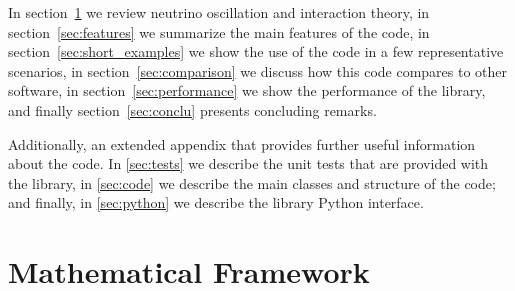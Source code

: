 \documentclass[3p,12pt]{elsarticle}
\newcommand{\ttf}{\ttfamily}
\begin{document}
In section~\ref{sec:theory}
we review neutrino oscillation and interaction theory, 
in section~\ref{sec:features} we summarize the main features of the code, 
in section~\ref{sec:short_examples} we show the use of the code in a few representative scenarios, 
in section~\ref{sec:comparison} we discuss how this code compares to other software,
in section~\ref{sec:performance} we show the performance of
the library, and finally section~\ref{sec:conclu} presents concluding remarks.

\ifdefined\forjournal
\else
Additionally, an extended appendix that provides
further useful information about the code.
In \ref{sec:tests} we describe the unit tests that
are provided with the library, in \ref{sec:code} we describe
the main classes and structure of the code; and finally, in \ref{sec:python}
we describe the library {\ttf Python} interface. 
\fi %

\section{Mathematical Framework}
\label{sec:theory}
\end{document}
